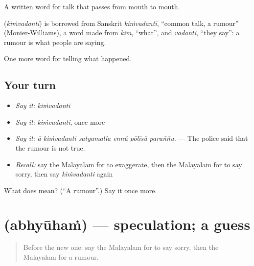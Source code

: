 A written word for talk that passes from mouth to mouth.

\begin{cousinweb}
\textbf{} (\emph{kiṁvadanti}) is borrowed from Sanskrit \emph{kiṁvadantī}, \textquotedblleft{}common talk, a rumour\textquotedblright{} (Monier-Williams), a word made from \emph{kim}, \textquotedblleft{}what\textquotedblright{}, and \emph{vadanti}, \textquotedblleft{}they say\textquotedblright{}: a rumour is what people are saying.
\end{cousinweb}

\begin{grammarlens}[title={What you've built}]
One more word for telling what happened.
\end{grammarlens}

\subsection*{Your turn}
\begin{itemize}
\raggedright
  \item \emph{Say it:} \emph{kiṁvadanti}
  \item \emph{Say it:} \emph{kiṁvadanti}, once more
  \item \emph{Say it:} \emph{ā kiṁvadanti satyamalla ennŭ pōlīsŭ paṟaññu.} — The police said that the rumour is not true.
  \item \emph{Recall:} say the Malayalam for to exaggerate, then the Malayalam for to say sorry, then say \emph{kiṁvadanti} again
\end{itemize}

\begin{tcolorbox}[breakable,colback=teal!4,colframe=teal!35!black,title={Before you move on}]
What does  mean? (\textquotedblleft{}A rumour\textquotedblright{}.) Say it once more.
\end{tcolorbox}
\section[\texorpdfstring{\ml{അഭ്യൂഹം} (abhyūhaṁ)}{അഭ്യൂഹം (abhyūhaṁ)}]{ (abhyūhaṁ) — speculation; a guess}

\label{lesson:ML-C353-abhyuham}



\begin{quote}
Before the new one: say the Malayalam for to say sorry, then the Malayalam for a rumour.
\end{quote}


